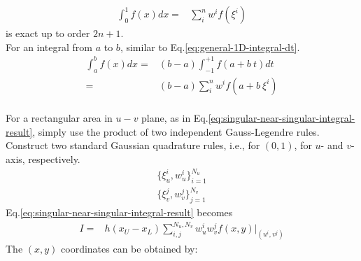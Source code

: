 \documentclass [10pt,letterpaper]{article}
\begin{document}
\begin{equation} \label{eq:singular-near-singular-gauss-legendre-rule-example}
	\begin{split} 
		\int \nolimits_{0}^{1}
		f(x)
		dx
		=&
		\sum \limits_{i}^{n}
		w^i
		f(\xi^i)
	\end{split}
\end{equation}
is exact up to order $2n+1$.
\\
For an integral from $a$ to $b$, similar to Eq.\eqref{eq:general-1D-integral-dt}.
\begin{equation} \label{eq:singular-near-singular-general-1D-quadrature}
	\begin{split} 
		\int \nolimits_{a}^{b}
		f(x)
		dx
		=& 
		(b-a)
		\int \nolimits_{-1}^{+1} 
		f(a+b\ t)
		dt
		\\
		=&
		(b-a)
		\sum \limits_{i}^{n}
		w^i
		f(a+b\ \xi^i)
	\end{split}
\end{equation}
\\
For a rectangular area in $u-v$ plane, 
as in Eq.\eqref{eq:singular-near-singular-integral-result},
simply use the product of two independent Gauss-Legendre rules.
Construct two standard Gaussian quadrature rules, i.e., for $(0,1)$, for $u$- and $v$- axis, respectively.
\begin{equation} \label{eq:singular-near-singular-xiu-xiv}
	\begin{split} 
		\{ \xi_u^i, w_u^i \}_{i=1}^{N_u}
		\\
		\{ \xi_v^j, w_v^j \}_{j=1}^{N_v}
	\end{split}
\end{equation}
Eq.\eqref{eq:singular-near-singular-integral-result} becomes
\begin{equation} \label{eq:singular-near-singular-general-quadrature}
	\begin{split} 
		I
		=&
		h
		(x_U-x_L)
		\sum \nolimits_{i,j}^{N_u,N_v} 
		w_u^i w_v^j
		f(x,y)
		\big\vert
		_{ (u^i,v^j) }
	\end{split}
\end{equation}
The $(x,y)$ coordinates can be obtained by:
\end{document}
